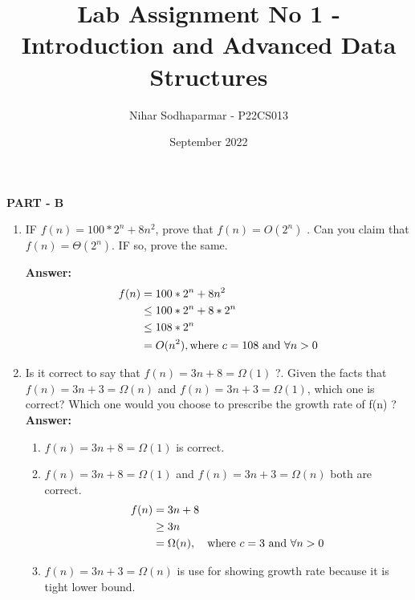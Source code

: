 \documentclass[a4paper]{article}
\title{Lab Assignment No 1 - Introduction and Advanced Data Structures}
\author{Nihar Sodhaparmar - P22CS013}
\date{September 2022}
\begin{document}
\maketitle

\begin{center}
    \textbf{\Large PART - B}
\end{center}

\begin{enumerate}[label=(\alph*)]
     \item IF {$ f(n) = 100 * 2^n + 8n^2 $}, prove that {$ f(n) = O(2^n) $} . Can you claim that {$ f(n) = \Theta(2^n) $}. IF so, prove the same.
 
     \textbf{Answer:}
     \begin{align*}
         f(n) & = 100 * 2^n + 8 n^2 \\
         &\le 100 * 2^n + 8 * 2^n \\
         &\le 108 * 2^n \\
         &= O(n^2), \text{where  $ c = 108 $  and  $ \forall   n > 0 $}
     \end{align*}
     
     \vspace{0.5cm}
     \item Is it correct to say that {$ f(n) = 3n + 8 = \Omega(1) $} ?. Given the facts that {$ f(n)=3n + 3=\Omega(n) $} and {$ f(n)=3n+3 = \Omega(1) $}, which one is correct? Which one would you choose to prescribe the growth rate of f(n) ?
     \textbf{Answer:}
 
     \begin{enumerate}[label=(\roman*)]
         \item {$ f(n) = 3n + 8 = \Omega(1) $} is correct.
    
         \vspace{0.5cm}
         \item {$ f(n) = 3n + 8 = \Omega(1) $} and {$ f(n)=3n + 3=\Omega(n) $} both are correct.
         \begin{align*}
             f(n) & = 3n + 8 \\
             & \ge 3n \\
             & = \Omega(n), \quad \text{where {$ c = 3 $} and {$ \forall n > 0 $}}
         \end{align*}
    
         \vspace{0.5cm}
         \item {$ f(n)=3n + 3=\Omega(n) $} is use for showing growth rate because it is tight lower bound.
     \end{enumerate}
 

\end{enumerate}
\end{document}
